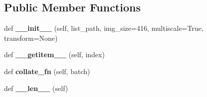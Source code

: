 \subsection*{Public Member Functions}
\begin{DoxyCompactItemize}
\item 
\mbox{\label{classutils_1_1datasets_1_1ListDataset_a4a7e8f0fe6210fb19dc63ad6df9c5a7c}} 
def {\bfseries \+\_\+\+\_\+init\+\_\+\+\_\+} (self, list\+\_\+path, img\+\_\+size=416, multiscale=True, transform=None)
\item 
\mbox{\label{classutils_1_1datasets_1_1ListDataset_a0d5ae416a97480865bcaff586ea42c98}} 
def {\bfseries \+\_\+\+\_\+getitem\+\_\+\+\_\+} (self, index)
\item 
\mbox{\label{classutils_1_1datasets_1_1ListDataset_aa0ea8b31c4893b7ed671f69590befb32}} 
def {\bfseries collate\+\_\+fn} (self, batch)
\item 
\mbox{\label{classutils_1_1datasets_1_1ListDataset_a9fe91a5e022799d4a7efb713a6082db3}} 
def {\bfseries \+\_\+\+\_\+len\+\_\+\+\_\+} (self)
\end{DoxyCompactItemize}
